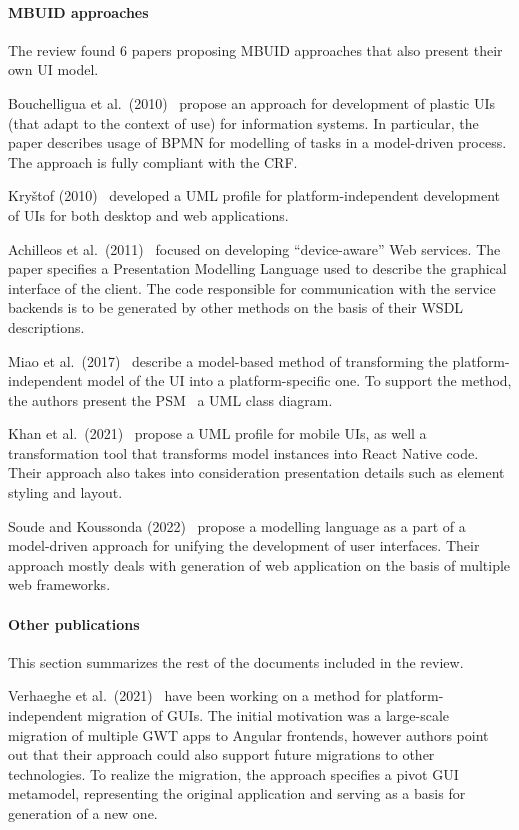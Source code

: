 \paragraph{MBUID approaches}

The review found 6 papers proposing MBUID approaches that also present their own UI model.

Bouchelligua et al.\ (2010)~\cite{Bouchelligua2010} propose an approach for development of plastic UIs (that adapt to the context of use) for information systems.
In particular, the paper describes usage of BPMN for modelling of tasks in a model-driven process.
The approach is fully compliant with the CRF\@.

Kryštof (2010)~\cite{kryvstof2010lpgm} developed a UML profile for platform-independent development of UIs for both desktop and web applications.

Achilleos et al.\ (2011)~\cite{Achilleos2011} focused on developing \enquote{device-aware} Web services.
The paper specifies a Presentation Modelling Language used to describe the graphical interface of the client.
The code responsible for communication with the service backends is to be generated by other methods on the basis of their WSDL descriptions.

Miao et al.\ (2017)~\cite{Miao2017} describe a model-based method of transforming the platform-independent model of the UI into a platform-specific one.
To support the method, the authors present the PSM \textendash\ a UML class diagram.

Khan et al.\ (2021)~\cite{Khan2021} propose a UML profile for mobile UIs, as well a transformation tool that transforms model instances into React Native code.
Their approach also takes into consideration presentation details such as element styling and layout.

Soude and Koussonda (2022)~\cite{Soude2022} propose a modelling language as a part of a model-driven approach for unifying the development of user interfaces.
Their approach mostly deals with generation of web application on the basis of multiple web frameworks.

\paragraph{Other publications}

This section summarizes the rest of the documents included in the review.

Verhaeghe et al.\ (2021)~\cite{Verhaeghe2021visual, Verhaeghe2021behavior} have been working on a method for platform-independent migration of GUIs.
The initial motivation was a large-scale migration of multiple GWT apps to Angular frontends, however authors point out that their approach could also support future migrations to other technologies.
To realize the migration, the approach specifies a pivot GUI metamodel, representing the original application and serving as a basis for generation of a new one.

